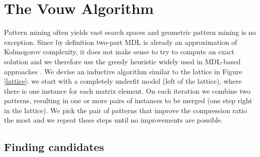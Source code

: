 \documentclass{llncs}
\begin{document}
\section{The Vouw Algorithm}

Pattern mining often yields vast search spaces and geometric pattern mining is no exception. Since by definition two-part MDL is already an approximation of Kolmogorov complexity, it does not make sense to try to compute an exact solution and we therefore use the greedy heuristic widely used in MDL-based approaches \cite{krimp,slim,classy}. We devise an inductive algorithm similar to the lattice in Figure \ref{lattice}: we start with a completely underfit model (left of the lattice), where there is one instance for each matrix element. On each iteration we combine two patterns, resulting in one or more pairs of instances to be merged (one step right in the lattice). We pick the pair of patterns that improve the compression ratio the most and we repeat these steps until no improvements are possible.


\subsection{Finding candidates}
\end{document}
